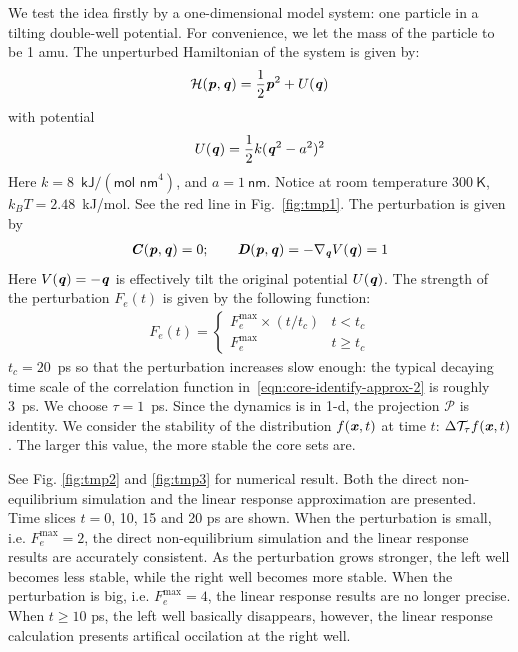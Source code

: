 \documentclass[aip,jcp,a4paper,reprint,onecolumn]{revtex4-1}
\newcommand{\vect}[1]{\textbf{\textit{#1}}}
\newcommand{\mh}{\mathcal H}
\newcommand{\mt}{\mathcal T}
\begin{document}
We test the idea firstly by a one-dimensional model system: one particle in a
tilting double-well potential. For convenience, we let the mass of the
particle to be 1 \textsf{amu}. The unperturbed
Hamiltonian of the system is given by:
\begin{align}
  \mh (\vect p, \vect q) = \frac 12 \vect p^2 + U(\vect q) 
\end{align}
with potential
\begin{align}
  U(\vect q) = \frac12 k (\vect q^2 - a^2)^2
\end{align}
Here $k = 8$~$\textsf{kJ} / (\textsf{mol nm}^4)$, and $ a = 1\ \textsf{nm}$.
Notice at room temperature $300\ \textsf{K}$, $k_BT = 2.48$~\textsf{kJ/mol}.
See the red line in Fig.~\ref{fig:tmp1}.
The perturbation is given by
\begin{align}
  \vect C(\vect p, \vect q) = 0; \qquad
  \vect D(\vect p, \vect q) = -\nabla_{\vect q} V(\vect q) = 1
\end{align}
Here $V(\vect q) = -\vect q$ is  effectively tilt the original
potential $U(\vect q)$. The strength of the perturbation $F_e(t)$ is given
by the following function:
\begin{align}
  F_e(t) = 
  \begin{cases}
    F_e^{\textrm{max}}\times (t / t_c) & t < t_c \\
    F_e^{\textrm{max}} & t \geq t_c
  \end{cases}
\end{align}
$t_c = 20$~\textsf{ps} so that the perturbation increases slow
enough: the typical decaying time scale of the correlation function
in~\eqref{eqn:core-identify-approx-2} is roughly 3~\textsf{ps}.
We choose $\tau = 1$~\textsf{ps}.
Since the dynamics is in
1-d, the projection $\mathcal P$ is identity.  We consider the stability of the
distribution $f(\vect x, t)$ at time $t$: $\Delta\mt_\tau f(\vect x, t)$.
The larger
this value, the more stable the core sets are.

See Fig. \ref{fig:tmp2} and \ref{fig:tmp3} for numerical result.  Both
the direct non-equilibrium simulation and the linear response
approximation are presented. Time slices $t = 0$, 10, 15 and 20
\textsf{ps} are shown.  When the perturbation is small,
i.e. $F_e^{\textrm{max}} = 2$, the direct non-equilibrium simulation
and the linear response results are accurately consistent. As the
perturbation grows stronger, the left well becomes less stable, while
the right well becomes more stable.  When the perturbation is big,
i.e. $F_e^{\textrm{max}} = 4$, the linear response results are no
longer precise. When $t\geq 10$ \textsf{ps}, the left well basically
disappears, however, the linear response calculation presents
artifical occilation at the right well.
\end{document}
